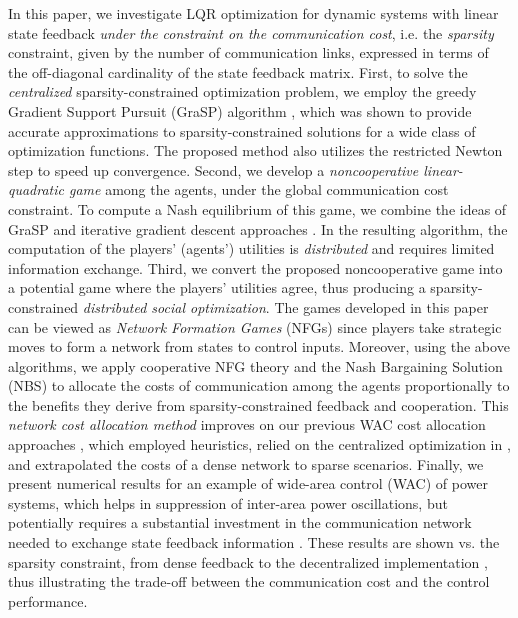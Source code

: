 \documentclass[12pt, draftclsnofoot,onecolumn]{IEEEtran}
\begin{document}
In this paper, we investigate LQR optimization for dynamic systems with linear state feedback {\it under the constraint on the communication cost}, i.e. the {\it sparsity} constraint, given by the number of communication links, expressed in terms of the off-diagonal cardinality of the state feedback matrix. First, to solve the {\it centralized} sparsity-constrained optimization problem, we employ the greedy Gradient Support Pursuit (GraSP) algorithm \cite{bahmani2013greedy}, which was shown to provide accurate approximations to sparsity-constrained solutions for a wide class of optimization functions. The proposed method also utilizes the restricted Newton step \cite{fardad2009optimal} to speed up convergence. Second, we develop a {\it noncooperative linear-quadratic game} among the agents, under the global communication cost constraint. To compute a Nash equilibrium of this game, we combine the ideas of GraSP and iterative gradient descent approaches \cite{ratliff2013characterization,li2013designing}. In the resulting algorithm, the computation of the players' (agents') utilities is {\it distributed} and requires limited information exchange. Third, we convert the proposed noncooperative game into a potential game \cite{li2013designing} where the players' utilities agree, thus producing a sparsity-constrained {\it distributed social optimization}. The games developed in this paper can be viewed as {\it Network Formation Games} (NFGs) \cite{van2005models} since players take strategic moves to form a network from states to control inputs. Moreover, using the above algorithms, we apply cooperative NFG theory \cite{van2005models} and the Nash Bargaining Solution (NBS) \cite{Avrachenkov2015265,kawamori2016nash} to allocate the costs of communication among the agents proportionally to the benefits they derive from sparsity-constrained feedback and cooperation. This {\it network cost allocation method} improves on our previous WAC cost allocation approaches \cite{Lian:2014aa,lianensuring}, which employed heuristics, relied on the centralized optimization in \cite{dorjovchebulTPS14}, and extrapolated the costs of a dense network \cite{Mukaidani2006} to sparse scenarios. Finally, we present numerical results for an example of wide-area control (WAC) of power systems, which helps in suppression of inter-area power oscillations, but potentially requires a substantial investment in the communication network needed to exchange state feedback information \cite{naspinet,pramod,lianensuring,dorjovchebulTPS14,deng2012communication,chenine2009survey,pthorp}. These results are shown vs. the sparsity constraint, from dense feedback \cite{Mukaidani2006} to the decentralized implementation \cite{lianensuring}, thus illustrating the trade-off between the communication cost and the control performance.
\end{document}
